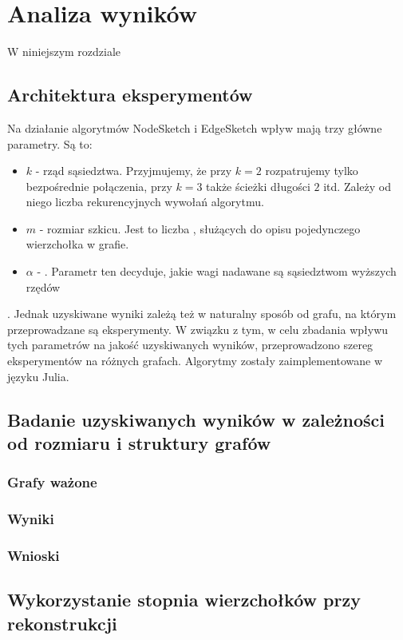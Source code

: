 \chapter{Analiza wyników}

    W niniejszym rozdziale 

\section{Architektura eksperymentów}

    Na działanie algorytmów NodeSketch i EdgeSketch wpływ mają trzy główne parametry. Są to:
    \begin{itemize}
        \item $k$ - rząd sąsiedztwa. Przyjmujemy, że przy $k = 2$ rozpatrujemy tylko bezpośrednie połączenia, przy $k = 3$ także ścieżki długości $2$ itd. Zależy od niego liczba rekurencyjnych wywołań algorytmu.
        \item $m$ - rozmiar szkicu. Jest to liczba , służących do opisu pojedynczego wierzchołka w grafie. 
        \item $\alpha$ - . Parametr ten decyduje, jakie wagi nadawane są sąsiedztwom wyższych rzędów
    \end{itemize}

    . Jednak uzyskiwane wyniki zależą też w naturalny sposób od grafu, na którym przeprowadzane są eksperymenty. W związku z tym, w celu zbadania wpływu tych parametrów na jakość uzyskiwanych wyników, przeprowadzono szereg eksperymentów na różnych grafach. Algorytmy zostały zaimplementowane w języku Julia.

\section{Badanie uzyskiwanych wyników w zależności od rozmiaru i struktury grafów}
    \subsection{Grafy ważone}
    \subsection{Wyniki}

    \subsection{Wnioski}

\section{Wykorzystanie stopnia wierzchołków przy rekonstrukcji}

